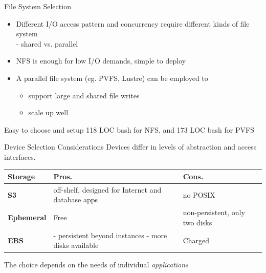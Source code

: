 \documentclass{beamer}
\begin{document}
\begin{frame}{File System Selection}
    \begin{itemize}
        \item Different I/O access pattern and concurrency require different kinds of
            file system\\
            - shared vs. parallel
        \item NFS is enough for low I/O demands, simple to deploy
        \item A parallel file system (eg. PVFS, Lustre) can be employed to
            \begin{itemize} 
                \item support large and shared file writes
                \item scale up well
            \end{itemize}
    \end{itemize}
    \pause
    \begin{exampleblock}{Easy to choose and setup}
        118 LOC bash for NFS, and 173 LOC bash for PVFS
    \end{exampleblock}
\end{frame}

\begin{frame}{Device Selection Considerations}
    Devices differ in levels of abstraction and access interfaces.
    \begin{tabular}{p{2.0cm}|p{5.0cm}|p{3.0cm}}
        \toprule
        \textbf{Storage} & \textbf{Pros.} & \textbf{Cons.} \\
        \midrule
        \textbf{S3}      &
            off-shelf, designed for Internet and database apps &
            no POSIX \\
        \midrule
        \textbf{Ephemeral} &
            Free & non-persistent, only two disks\\
        \midrule
        \textbf{EBS} &
            - persistent beyond instances - more disks available &
            Charged \\
        \bottomrule
    \end{tabular}
    \vspace{.3cm}
    \pause
    \begin{block}{}
        The choice depends on the needs of individual \emph{applications}
    \end{block}
\end{frame}
\end{document}
